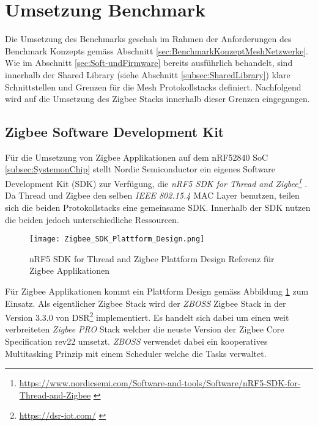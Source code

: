 \clearpage

\section{Umsetzung Benchmark}\label{sec:ZigbeeUmsetzungBenchmark}
Die Umsetzung des Benchmarks geschah im Rahmen der Anforderungen des Benchmark Konzepts gemäss Abschnitt \ref{sec:BenchmarkKonzeptMeshNetzwerke}.
Wie im Abschnitt \ref{sec:Soft-undFirmware} bereits ausführlich behandelt, sind innerhalb der Shared Library (siehe Abschnitt \ref{subsec:SharedLibrary}) klare Schnittstellen und Grenzen für die Mesh Protokollstacks definiert.
Nachfolgend wird auf die Umsetzung des Zigbee Stacks innerhalb dieser Grenzen eingegangen.

\subsection{Zigbee Software Development Kit}\label{subsec:ZigbeeSoftwareDevelopmentKit}
Für die Umsetzung von Zigbee Applikationen auf dem nRF52840 SoC \ref{subsec:SystemonChip} stellt Nordic Semiconductor ein eigenes Software Development Kit (SDK) zur Verfügung, die \textit{nRF5 SDK for Thread and Zigbee\footnote{\url{https://www.nordicsemi.com/Software-and-tools/Software/nRF5-SDK-for-Thread-and-Zigbee} \cite{nordic_semi_nrf_sdk_for_thread_and_zigbee_2020}}} .
Da Thread und Zigbee den selben \textit{IEEE 802.15.4} MAC Layer benutzen, teilen sich die beiden Protokollstacks eine gemeinsame SDK.
Innerhalb der SDK nutzen die beiden jedoch unterschiedliche Ressourcen.

\begin{figure}[h]
	\centering
	\texttt{[image: Zigbee\_SDK\_Plattform\_Design.png]}
	\caption{nRF5 SDK for Thread and Zigbee Plattform Design Referenz für Zigbee Applikationen \cite{nordic_semi_nrf_sdk_for_thread_and_zigbee_2020}}
	\label{fig:ZigbeePlattformDesign}
\end{figure}

Für Zigbee Applikationen kommt ein Plattform Design gemäss Abbildung \ref{fig:ZigbeePlattformDesign} zum Einsatz. 
Als eigentlicher Zigbee Stack wird der \textit{ZBOSS} Zigbee Stack in der Version 3.3.0 von DSR\footnote{\url{https://dsr-iot.com/} \cite{dsr_corporation_dsr_nodate}} implementiert.
Es handelt sich dabei um einen weit verbreiteten \textit{Zigbee PRO} Stack welcher die neuste Version der Zigbee Core Specification rev22 umsetzt.
\textit{ZBOSS} verwendet dabei ein kooperatives Multitasking Prinzip mit einem Scheduler welche die Tasks verwaltet.

